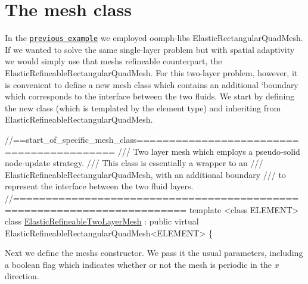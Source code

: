  

\hypertarget{index_mesh}{}\section{The mesh class}\label{index_mesh}
In the \href{../../single_layer_free_surface/html/index.html#main}{\tt previous example} we employed {\ttfamily oomph-\/lib\textquotesingle{}s} {\ttfamily Elastic\+Rectangular\+Quad\+Mesh}. If we wanted to solve the same single-\/layer problem but with spatial adaptivity we would simply use that mesh\textquotesingle{}s refineable counterpart, the {\ttfamily Elastic\+Refineable\+Rectangular\+Quad\+Mesh}. For this two-\/layer problem, however, it is convenient to define a new mesh class which contains an additional `boundary\textquotesingle{} which corresponds to the interface between the two fluids. We start by defining the new class (which is templated by the element type) and inheriting from {\ttfamily Elastic\+Refineable\+Rectangular\+Quad\+Mesh}.

 
\begin{DoxyCodeInclude}
\textcolor{comment}{//==start\_of\_specific\_mesh\_class==========================================}
\textcolor{comment}{/// Two layer mesh which employs a pseudo-solid node-update strategy.}
\textcolor{comment}{}\textcolor{comment}{/// This class is essentially a wrapper to an }
\textcolor{comment}{}\textcolor{comment}{/// ElasticRefineableRectangularQuadMesh, with an additional boundary}
\textcolor{comment}{}\textcolor{comment}{/// to represent the interface between the two fluid layers.}
\textcolor{comment}{}\textcolor{comment}{//========================================================================}
\textcolor{keyword}{template} <\textcolor{keyword}{class} ELEMENT>
\textcolor{keyword}{class }\hyperlink{classElasticRefineableTwoLayerMesh}{ElasticRefineableTwoLayerMesh} :
 \textcolor{keyword}{public} \textcolor{keyword}{virtual} ElasticRefineableRectangularQuadMesh<ELEMENT>
\{

\end{DoxyCodeInclude}


Next we define the mesh\textquotesingle{}s constructor. We pass it the usual parameters, including a boolean flag which indicates whether or not the mesh is periodic in the $ x $ direction.


